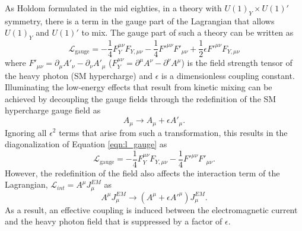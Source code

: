 As Holdom \cite{Holdom:1985ag} formulated in the mid eighties, in a theory with 
$U(1)_Y \times U(1)'$ symmetry, there is a term in the gauge part of the Lagrangian 
that allows $U(1)_Y$ and $U(1)'$ to mix.  The gauge part of such a theory can
be written as
\begin{equation}
    \mathcal{L}_{\text{gauge}} = - \frac{1}{4} F_Y^{\mu \nu}F_{Y, \mu \nu}
                          - \frac{1}{4} F'^{\mu \nu}F'_{\mu \nu}
                          + \frac{1}{2} \epsilon F'^{\mu \nu} F_{Y, \mu \nu}
    \label{eqn:l_gauge}
\end{equation}
where $F'_{\mu \nu} = \partial_{\mu}A'_{\nu} - \partial_{\nu}A'_{\mu}$ 
($F^{\mu \nu}_{Y} = \partial^{\mu}A^{\nu} - \partial^{\nu}A^{\mu}$) is the
field strength tensor of the heavy photon (SM hypercharge) and $\epsilon$ is a
dimensionless coupling constant.  Illuminating the low-energy effects that result
from kinetic mixing can be achieved by decoupling the gauge fields through the
redefinition of the SM hypercharge gauge field as
\begin{equation}
    A_{\mu} \rightarrow A_{\mu} + \epsilon A'_{\mu}.
\end{equation}
Ignoring all $\epsilon^2$ terms that arise from such a transformation, this
results in the diagonalization of Equation \ref{eqn:l_gauge} as
\begin{equation}
    \mathcal{L}_{\text{gauge}} = - \frac{1}{4} F_Y^{\mu \nu}F_{Y, \mu \nu}
                          - \frac{1}{4} F'^{\mu \nu}F'_{\mu \nu}.
\end{equation}
However, the redefinition of the field also affects the interaction term of 
the Lagrangian, $\mathcal{L}_{int} = A^{\mu}J_{\mu}^{EM}$ as
\begin{equation}
    A^{\mu}J_{\mu}^{EM} \rightarrow (A^{\mu} + \epsilon A'^{\mu})J_{\mu}^{EM}.
\end{equation}
As a result, an effective coupling is induced between the electromagnetic 
current and the heavy photon field that is suppressed by a factor of $\epsilon$.

